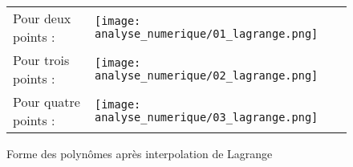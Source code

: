 \begin{figure}[H]
    \centering
    \begin{tabular}{m{4cm} m{6cm}} %
        Pour deux points : & \texttt{[image: analyse\_numerique/01\_lagrange.png]} \\
        Pour trois points : & \texttt{[image: analyse\_numerique/02\_lagrange.png]} \\
        Pour quatre points : & \texttt{[image: analyse\_numerique/03\_lagrange.png]} \\
    \end{tabular}
    \caption{Forme des polynômes après interpolation de Lagrange}
    \label{01_lagrange}
\end{figure}
